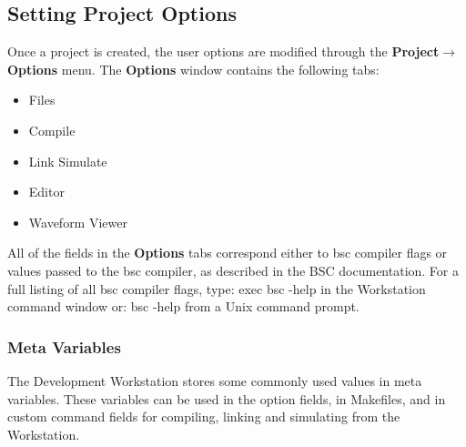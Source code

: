 \documentclass{article}
\newenvironment{centerboxverbatim}
  {\center
   \boxedverbatim}
  {\endboxedverbatim
  {\endcenter }}
\begin{document}


\subsection{Setting Project Options}
\label{project-options}

Once a project is created, the user options are modified through the {\bf Project$\rightarrow$Options} menu.
The {\bf Options} window contains the following  tabs:
\begin{itemize}
\item Files
\item Compile
\item Link Simulate
\item Editor
\item Waveform Viewer
\end{itemize}

All of the fields in the {\bf Options} tabs
correspond either to bsc compiler flags or values passed to the bsc
compiler, as described in the BSC documentation.
For a full listing of all bsc compiler flags, type:
\begin{centerboxverbatim}
exec bsc -help
\end{centerboxverbatim}
in the Workstation command window or:
\begin{centerboxverbatim}
bsc -help
\end{centerboxverbatim}
from a Unix command prompt.


\subsubsection{Meta Variables}
\label{metavariable}



The Development Workstation stores some commonly used values in meta
variables.  These variables can be used in the option fields, in
Makefiles, and in custom
command fields for compiling, linking and simulating from the Workstation.
\end{document}
